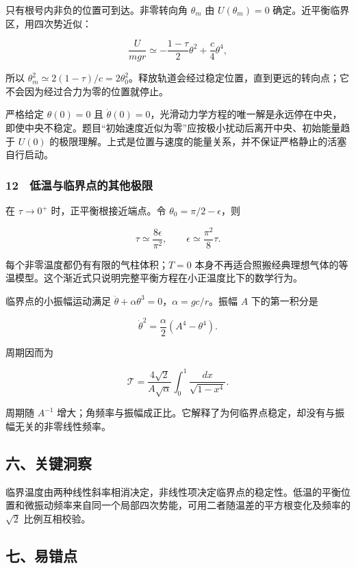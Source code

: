 \documentclass[12pt,a4paper,fontset=fandol]{ctexart}
\begin{document}
只有根号内非负的位置可到达。非零转向角 \(\theta_m\) 由 \(U(\theta_m)=0\)
确定。近平衡临界区，用四次势近似：

\[\frac{U}{mgr}\simeq-\frac{1-\tau}{2}\theta^2+\frac c4\theta^4,\]

所以
\(\theta_m^2\simeq2(1-\tau)/c=2\theta_0^2\)。释放轨道会经过稳定位置，直到更远的转向点；它不会因为经过合力为零的位置就停止。

严格给定 \(\theta(0)=0\) 且
\(\dot\theta(0)=0\)，光滑动力学方程的唯一解是永远停在中央，即使中央不稳定。题目``初始速度近似为零''应按极小扰动后离开中央、初始能量趋于
\(U(0)\)
的极限理解。上式是位置与速度的能量关系，并不保证严格静止的活塞自行启动。

\subsubsection{12　低温与临界点的其他极限}\label{ux4f4eux6e29ux4e0eux4e34ux754cux70b9ux7684ux5176ux4ed6ux6781ux9650}

在 \(\tau\to0^+\) 时，正平衡根接近端点。令
\(\theta_0=\pi/2-\epsilon\)，则

\[\tau\simeq\frac{8\epsilon}{\pi^2},\qquad
\epsilon\simeq\frac{\pi^2}{8}\tau.\]

每个非零温度都仍有有限的气柱体积；\(T=0\)
本身不再适合照搬经典理想气体的等温模型。这个渐近式只说明完整平衡方程在小正温度比下的数学行为。

临界点的小振幅运动满足
\(\ddot\theta+\alpha\theta^3=0\)，\(\alpha=gc/r\)。振幅 \(A\)
下的第一积分是

\[\dot\theta^2=\frac\alpha2(A^4-\theta^4).\]

周期因而为

\[\mathcal T=\frac{4\sqrt2}{A\sqrt\alpha}
\int_0^1\frac{dx}{\sqrt{1-x^4}}.\]

周期随 \(A^{-1}\)
增大；角频率与振幅成正比。它解释了为何临界点稳定，却没有与振幅无关的非零线性频率。

\subsection{六、关键洞察}\label{ux516dux5173ux952eux6d1eux5bdf-1}

临界温度由两种线性斜率相消决定，非线性项决定临界点的稳定性。低温的平衡位置和微振动频率来自同一个局部四次势能，可用二者随温差的平方根变化及频率的
\(\sqrt2\) 比例互相校验。

\subsection{七、易错点}\label{ux4e03ux6613ux9519ux70b9-1}
\end{document}
